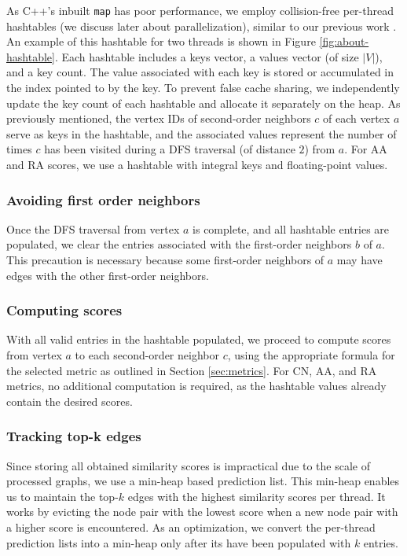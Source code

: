 As C++'s inbuilt \texttt{map} has poor performance, we employ collision-free per-thread hashtables (we discuss later about parallelization), similar to our previous work \cite{sahu2023gvelouvain}. An example of this hashtable for two threads is shown in Figure \ref{fig:about-hashtable}. Each hashtable includes a keys vector, a values vector (of size $|V|$), and a key count. The value associated with each key is stored or accumulated in the index pointed to by the key. To prevent false cache sharing, we independently update the key count of each hashtable and allocate it separately on the heap. As previously mentioned, the vertex IDs of second-order neighbors $c$ of each vertex $a$ serve as keys in the hashtable, and the associated values represent the number of times $c$ has been visited during a DFS traversal (of distance $2$) from $a$. For AA and RA scores, we use a hashtable with integral keys and floating-point values.





\subsubsection{Avoiding first order neighbors}

Once the DFS traversal from vertex $a$ is complete, and all hashtable entries are populated, we clear the entries associated with the first-order neighbors $b$ of $a$. This precaution is necessary because some first-order neighbors of $a$ may have edges with the other first-order neighbors.


\subsubsection{Computing scores}

With all valid entries in the hashtable populated, we proceed to compute scores from vertex $a$ to each second-order neighbor $c$, using the appropriate formula for the selected metric as outlined in Section \ref{sec:metrics}. For CN, AA, and RA metrics, no additional computation is required, as the hashtable values already contain the desired scores.


\subsubsection{Tracking top-k edges}

Since storing all obtained similarity scores is impractical due to the scale of processed graphs, we use a min-heap based prediction list. This min-heap enables us to maintain the top-$k$ edges with the highest similarity scores per thread. It works by evicting the node pair with the lowest score when a new node pair with a higher score is encountered. As an optimization, we convert the per-thread prediction lists into a min-heap only after its have been populated with $k$ entries.


